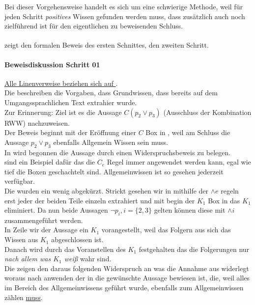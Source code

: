 Bei dieser Vorgehensweise handelt es sich um eine schwierige Methode, weil für jeden Schritt \emph{positives} Wissen gefunden werden muss, dass zusätzlich auch noch zielführend ist für den eigentlichen zu beweisenden Schluss.\\\\


 zeigt den formalen Beweis des ersten Schnittes,  den zweiten Schritt.


\paragraph{Beweisdiskussion \WMR Schritt 01}
\underline{Alle Linenverweise beziehen sich auf }.\\
Die  beschreiben die Vorgaben, dass Grundwissen, dass bereits auf dem Umgangssprachlichen Text extrahier wurde.\\
Zur Erinnerung: Ziel ist es die Aussage $C(p_2 \vee p_3)$ (Ausschluss der Kombination RWW) nachzuweisen.\\
Der Beweis beginnt mit der Eröffnung einer $C$ Box in , weil am Schluss die Aussage $p_2 \vee p_3$ ebenfalls Allgemein Wissen sein muss.\\
In  wird begonnen die Aussage durch einen Widerspruchsbeweis zu belegen.\\
 sind ein Beispiel dafür das die $C_e$ Regel immer angewendet werden kann, egal wie tief die Boxen geschachtelt sind.
Allgemeinwissen ist so gesehen jederzeit verfügbar.\\
Die  wurden ein wenig abgekürzt.
Strickt gesehen wir in  mithilfe der $\wedge e$ regeln erst jeder der beiden Teile einzeln extrahiert und mit begin der $K_1$ Box in  das $K_1$ eliminiert.
Da nun beide Aussagen $\neg p_i, i=\{2,3\}$ gelten können diese mit $\wedge i$ zusammengeführt werden.\\
In Zeile  wir der Aussage ein $K_1$ vorangestellt, weil das Folgern aus sich das Wissen aus $K_1$ abgeschlossen ist.\\
Danach wird durch das Voranstellen des $K_1$ festgehalten das die Folgerungen nur \emph{nach allem was $K_1$ weiß} wahr sind.\\
Die  zeigen den daraus folgenden Widerspruch an was die Annahme aus  widerlegt woraus nach anwenden der \deMorganRegeln in  die gewünschte Aussage bewiesen ist, die, weil alles im Bereich des Allgemeinwissens geführt wurde, ebenfalls zum Allgemeinwissen zählen \underline{muss}.


